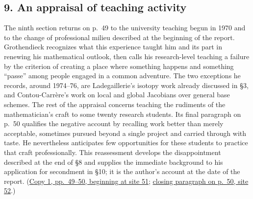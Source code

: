 \documentclass[11pt,a4paper]{article}
\begin{document}
\subsection*{9. An appraisal of teaching activity}
The ninth section returns on p.~49 to the university teaching begun in
1970 and to the change of professional milieu described at the beginning
of the report. Grothendieck recognizes what this experience taught him
and its part in renewing his mathematical outlook, then calls his
research-level teaching a failure by the criterion of creating a place
where something happens and something ``passe'' among people engaged in
a common adventure. The two exceptions he records, around 1974--76, are
Ladegaillerie's isotopy work already discussed in \S3, and
Contou-Carrère's work on local and global Jacobians over general base
schemes. The rest of the appraisal concerns teaching the rudiments of
the mathematician's craft to some twenty research students. Its final
paragraph on p.~50 qualifies the negative account by recalling work
better than merely acceptable, sometimes pursued beyond a single
project and carried through with taste. He nevertheless anticipates few
opportunities for these students to practice that craft professionally.
This reassessment develops the disappointment described at the end of
\S8 and supplies the immediate background to his application for
secondment in \S10; it is the author's account at the date of the report.
(\href{https://grothendieck.umontpellier.fr/web/viewer.html?file=../119.pdf\#page=52}{Copy 1, pp.~49--50, beginning at site 51};
\href{https://grothendieck.umontpellier.fr/web/viewer.html?file=../119.pdf\#page=53}{closing paragraph on p.~50, site 52}.)
\end{document}
